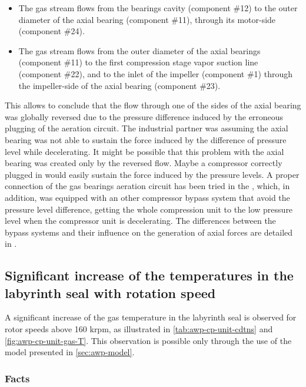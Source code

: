 \begin{itemize}
\item The gas stream flows from the bearings cavity (component \#12)
  to the outer diameter of the axial bearing (component \#11), through
  its motor-side (component \#24).
\item The gas stream flows from the outer diameter of the axial
  bearings (component \#11) to the first compression stage vapor
  suction line (component \#22), and to the inlet of the impeller
  (component \#1) through the impeller-side of the axial bearing
  (component \#23).
\end{itemize}

This allows to conclude that the flow through one of the sides of the
axial bearing was globally reversed due to the pressure difference
induced by the erroneous plugging of the aeration circuit. The
industrial partner was assuming the axial bearing was not able to
sustain the force induced by the difference of pressure level while
decelerating. It might be possible that this problem with the axial
bearing was created only by the reversed flow. Maybe a compressor
correctly plugged in would easily sustain the force induced by the
pressure levels. A proper connection of the gas bearings aeration
circuit has been tried in the \BWP{}, which, in addition, was equipped
with an other compressor bypass system that avoid the pressure level
difference, getting the whole compression unit to the low pressure
level when the compressor unit is decelerating. The differences between the bypass
systems and their influence on the generation of axial forces are
detailed in .

\subsection{Significant increase of the temperatures in
  the labyrinth seal with rotation speed}
\label{sec:awp-laby-hot-gas}

A significant increase of the gas temperature in the labyrinth seal is
observed for rotor speeds above 160 krpm, as illustrated in
\cref{tab:awp-cp-unit-cdtns} and \cref{fig:awp-cp-unit-gas-T}. This
observation is possible only through the use of the model presented in
\cref{sec:awp-model}.

\subsubsection{Facts}
\label{sec:awp-laby-seal-hot-gas-facts}

